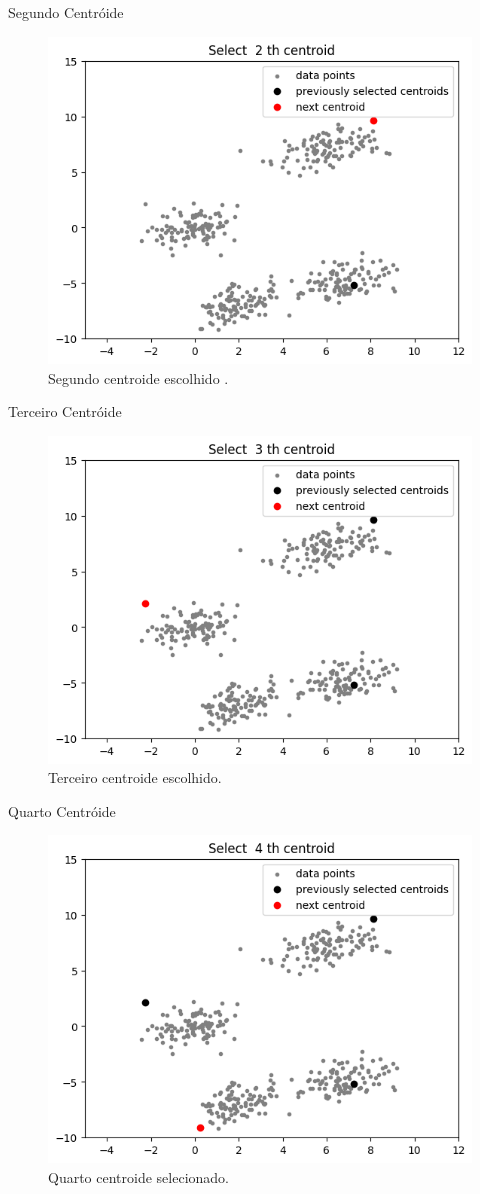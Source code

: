 \documentclass{beamer}
\begin{document}
\begin{frame}{Segundo Centróide}
    \begin{figure}
        \centering
        \includegraphics[width=0.7\linewidth]{imagens/kmeans_2.png}
        \caption{Segundo centroide escolhido \cite{geeksforgeeks_kmeans}.}
        \label{fig:centroide2}
    \end{figure}
\end{frame}
\begin{frame}{Terceiro Centróide}
    \begin{figure}
        \centering
        \includegraphics[width=0.7\linewidth]{imagens/kmeans_3.png}
        \caption{Terceiro centroide escolhido\cite{geeksforgeeks_kmeans}.}
        \label{fig:centroide3}
    \end{figure}
\end{frame}
\begin{frame}{Quarto Centróide}
    \begin{figure}
        \centering
        \includegraphics[width=0.7\linewidth]{imagens/kmeans_4.png}
        \caption{Quarto centroide selecionado\cite{geeksforgeeks_kmeans}.}
        \label{fig:centroide4}
    \end{figure}
\end{frame}
\end{document}
